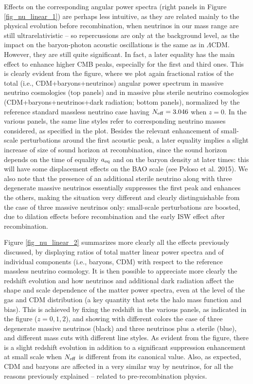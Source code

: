 \documentclass{emulateapj}
\begin{document}
Effects on the corresponding angular power spectra (right panels in Figure \ref{fig_nu_linear_1}) are 
perhaps less intuitive, as they are  related mainly to the physical evolution before recombination, when neutrinos in our mass range are still ultrarelativistic -- so
repercussions are only at the  background level, as the impact on the baryon-photon
acoustic oscillations is the same as in $\Lambda$CDM. However, they are still quite significant. 
In fact, a later equality has the main effect to enhance higher CMB peaks, especially for the first and third ones.
This is clearly evident from the figure, where we plot again fractional ratios of 
the total (i.e., CDM+baryons+neutrinos) angular power spectrum  in massive neutrino cosmologies (top panels)
and in massive plus sterile neutrino cosmologies (CDM+baryons+neutrinos+dark radiation; bottom panels), normalized by the reference standard massless  neutrino case having $N_{\rm eff}=3.046$ when $z=0$. 
In the various panels, the same line styles refer to corresponding neutrino masses considered, as specified in the plot.
Besides the relevant enhancement of small-scale perturbations around the first acoustic peak, a later equality implies  a
slight increase of size of sound horizon at recombination, since the sound horizon depends on the time of equality $a_{\rm eq}$ and on the baryon density at later times: 
this will have some displacement effects on the BAO scale (see Peloso et al. 2015).    
We also note that the presence of an additional sterile neutrino along with three degenerate massive neutrinos essentially suppresses the first peak and enhances the others,
making the situation very different and clearly distinguishable from the case of three massive neutrinos only: 
small-scale perturbations are boosted, due to dilation effects before recombination and the early ISW effect after recombination.
 
Figure \ref{fig_nu_linear_2} summarizes more clearly all the effects previously discussed, by displaying 
ratios of total matter linear power spectra and of individual components (i.e., baryons, CDM) with respect to the reference massless neutrino cosmology.
It is then possible to appreciate more clearly the redshift evolution and how neutrinos and additional dark radiation affect the shape and scale dependence of the 
matter power spectra, even at the level of the gas and CDM distribution (a key quantity that sets the halo mass function and bias). This is achieved by fixing the redshift in the various panels, as indicated in the figure ($z=0,1,2$),
and showing with different colors the case of three degenerate massive neutrinos (black) and three neutrinos plus a sterile (blue), and different mass cuts with different line styles.
As evident from the figure, there is a slight redshift evolution in addition to a significant suppression enhancement at small scale when $N_{\rm eff}$ is different from
its  canonical value. Also, as expected, CDM and baryons are affected in a very similar way by neutrinos, for all the reasons previously explained -- related to pre-recombination physics.
\end{document}
